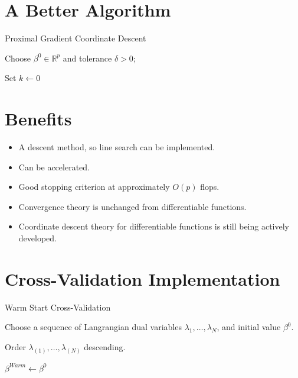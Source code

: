 \documentclass[10pt, reqno]{article}
\numberwithin{equation}{section}
\newcommand{\R}{\mathbb{R}}
\begin{document}
\newpage
\section*{A Better Algorithm}

\vspace{.5cm}
\begin{algorithm}[H]
\caption{Proximal Gradient Coordinate Descent}
Choose $\beta^0 \in \R^p$ and tolerance $\delta > 0$;

Set $k \gets 0$

\end{algorithm}

\newpage
\section*{Benefits}

\begin{itemize}
\item A descent method, so line search can be implemented.

\item Can be accelerated.

\item Good stopping criterion at approximately $O(p)$ flops.

\item Convergence theory is unchanged from differentiable functions.

\item Coordinate descent theory for differentiable functions is still being actively developed.

\end{itemize}

\newpage
\section*{Cross-Validation Implementation}

\vspace{.5cm}
\begin{algorithm}[H]
\caption{Warm Start Cross-Validation}
Choose a sequence of Langrangian dual variables $\lambda_1, \ldots, \lambda_N$, and initial value $\beta^0$.

Order $\lambda_{(1)}, \ldots, \lambda_{(N)}$ descending.

$\beta^{Warm} \gets \beta^0$ 


\end{algorithm}
\end{document}
